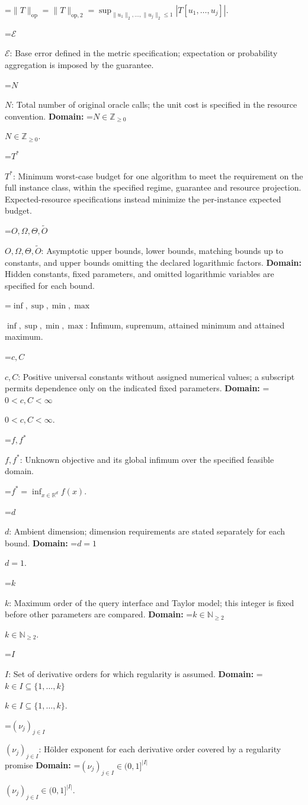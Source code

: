 \documentclass[10pt,a4paper]{article}
\newcommand{\AtlasMath}[1]{\par\begingroup\centering\setbox0=\hbox{$\displaystyle #1$}\ifdim\wd0>1.4\linewidth\typeout{ATLAS WIDE FORMULA: \the\wd0}\fi\ifdim\wd0>\linewidth\resizebox{\linewidth}{!}{\box0}\else\box0\fi\par\endgroup}
\newcommand{\AtlasInlineMath}[1]{\begingroup\setbox0=\hbox{$#1$}\ifdim\wd0>.4\linewidth\endgroup\AtlasMath{#1}\else\endgroup$#1$\fi}
\begin{document}
\AtlasMath{\|T\|_{\mathrm{op}}=\|T\|_{\mathrm{op},2}=\sup_{\|u_1\|_2,\ldots,\|u_j\|_2\le1}|T[u_1,\ldots,u_j]|.}


\AtlasInlineMath{\mathcal{E}}: Base error defined in the metric specification; expectation or probability aggregation is imposed by the guarantee.

\AtlasInlineMath{N}: Total number of original oracle calls; the unit cost is specified in the resource convention. \textbf{Domain:} \AtlasInlineMath{N\in\mathbb{Z}_{\ge0}}.

\AtlasInlineMath{T^*}: Minimum worst-case budget for one algorithm to meet the requirement on the full instance class, within the specified regime, guarantee and resource projection. Expected-resource specifications instead minimize the per-instance expected budget.

\AtlasInlineMath{O,\Omega,\Theta,\widetilde{O}}: Asymptotic upper bounds, lower bounds, matching bounds up to constants, and upper bounds omitting the declared logarithmic factors. \textbf{Domain:} Hidden constants, fixed parameters, and omitted logarithmic variables are specified for each bound.

\AtlasInlineMath{\inf,\sup,\min,\max}: Infimum, supremum, attained minimum and attained maximum.

\AtlasInlineMath{c,C}: Positive universal constants without assigned numerical values; a subscript permits dependence only on the indicated fixed parameters. \textbf{Domain:} \AtlasInlineMath{0<c,C<\infty}.

\AtlasInlineMath{f,f^*}: Unknown objective and its global infimum over the specified feasible domain.


\AtlasMath{f^*=\inf_{x\in \mathbb{R}^d}f(x).}


\AtlasInlineMath{d}: Ambient dimension; dimension requirements are stated separately for each bound. \textbf{Domain:} \AtlasInlineMath{d=1}.

\AtlasInlineMath{k}: Maximum order of the query interface and Taylor model; this integer is fixed before other parameters are compared. \textbf{Domain:} \AtlasInlineMath{k\in\mathbb{N}_{\ge2}}.

\AtlasInlineMath{I}: Set of derivative orders for which regularity is assumed. \textbf{Domain:} \AtlasInlineMath{k\in I\subseteq\{1,\ldots,k\}}.

\AtlasInlineMath{(\nu_j)_{j\in I}}: Hölder exponent for each derivative order covered by a regularity promise \textbf{Domain:} \AtlasInlineMath{(\nu_j)_{j\in I}\in(0,1]^{|I|}}.
\end{document}
